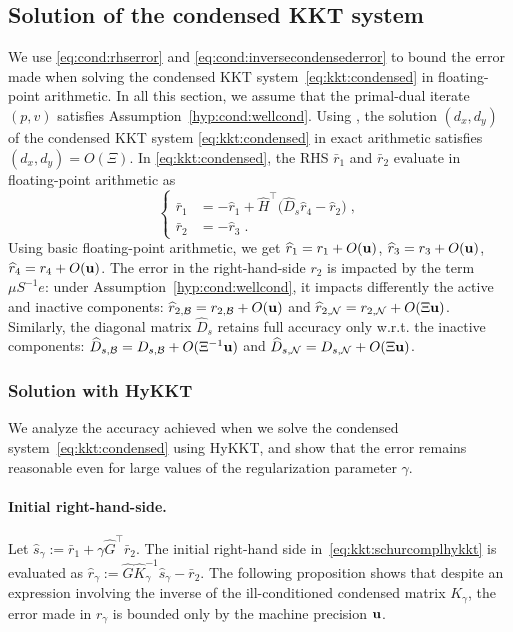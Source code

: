 \subsection{Solution of the condensed KKT system}
We use \eqref{eq:cond:rhserror} and \eqref{eq:cond:inversecondensederror}
to bound the error made when solving the condensed KKT system~\eqref{eq:kkt:condensed}
in floating-point arithmetic.
In all this section, we assume that
the primal-dual iterate $(p,v)$ satisfies Assumption~\ref{hyp:cond:wellcond}.
Using \cite[Corollary 3.3]{wright2001effects}, the solution $(d_x, d_y)$ of the
condensed KKT system \eqref{eq:kkt:condensed} in exact arithmetic satisfies
$(d_x, d_y) = O(\Xi)$.
In \eqref{eq:kkt:condensed}, the RHS $\bar{r}_1$ and $\bar{r}_2$
evaluate in floating-point arithmetic as
\begin{equation}
  \label{eq:cond:condensedrhs}
  \left\{
  \begin{aligned}
    \bar{r}_1 &= - \widehat{r}_1 + \widehat{H}^\top\big(\widehat{D}_{s} \widehat{r}_{4} - \widehat{r}_{2} \big) \;, \\
     \bar{r}_2 &= -\widehat{r}_3 \; .
  \end{aligned}
  \right.
\end{equation}
Using basic floating-point arithmetic, we get
$\widehat{r}_1 = r_1 + O(\mathbf{u})$,
$\widehat{r}_3 = r_3 + O(\mathbf{u})$,
$\widehat{r}_4 = r_4 + O(\mathbf{u})$.
The error in the right-hand-side $r_2$ is impacted by the term $\mu S^{-1}e$:
under Assumption~\ref{hyp:cond:wellcond}, it impacts differently
the active and inactive components:
$\widehat{r}_{2,\mathcal{B}}= r_{2,\mathcal{B}} + O(\mathbf{u})$ and
$\widehat{r}_{2,\mathcal{N}}= r_{2,\mathcal{N}} + O(\Xi \mathbf{u})$.
Similarly, the diagonal matrix $\widehat{D}_s$ retains full accuracy only
w.r.t. the inactive components: $\widehat{D}_{s,\mathcal{B}} = D_{s,\mathcal{B}} + O(\Xi^{-1} \mathbf{u})$
and $\widehat{D}_{s,\mathcal{N}} = D_{s,\mathcal{N}} + O(\Xi \mathbf{u})$.

\subsubsection{Solution with HyKKT}
We analyze the accuracy achieved when we solve the condensed system~\eqref{eq:kkt:condensed}
using HyKKT,
and show that the error remains reasonable even for large values of
the regularization parameter $\gamma$.

\paragraph{Initial right-hand-side.}
Let $\widehat{s}_\gamma := \bar{r}_1 + \gamma \widehat{G}^\top \bar{r}_2$.
The initial right-hand side in~\eqref{eq:kkt:schurcomplhykkt}
is evaluated as
$\widehat{r}_\gamma :=\widehat{G} \widehat{K}_\gamma^{-1} \widehat{s}_\gamma - \bar{r}_2$.
The following proposition shows that despite an expression involving the inverse
of the ill-conditioned condensed matrix $K_\gamma$, the error made in $r_\gamma$
is bounded only by the machine precision $\mathbf{u}$.

